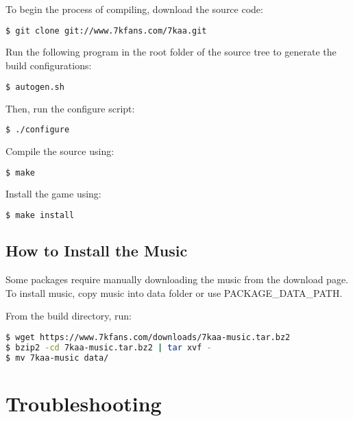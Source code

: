 To begin the process of compiling, download the source code:

\begin{lstlisting}[language=bash]
$ git clone git://www.7kfans.com/7kaa.git
\end{lstlisting}
	
Run the following program in the root folder of the source tree to generate the build configurations: 

\begin{lstlisting}[language=bash]
$ autogen.sh
\end{lstlisting}
	
Then, run the configure script:

\begin{lstlisting}[language=bash]
$ ./configure
\end{lstlisting}
	
Compile the source using:

\begin{lstlisting}[language=bash]
$ make
\end{lstlisting}

	
Install the game using:

\begin{lstlisting}[language=bash]
$ make install
\end{lstlisting}


\subsection{How to Install the Music}

Some packages require manually downloading the music from the download page. To install music, copy music into data folder or use PACKAGE\_DATA\_PATH.

From the build directory, run:

\begin{lstlisting}[language=bash]
$ wget https://www.7kfans.com/downloads/7kaa-music.tar.bz2
$ bzip2 -cd 7kaa-music.tar.bz2 | tar xvf -
$ mv 7kaa-music data/ 
\end{lstlisting}

\section{Troubleshooting}

